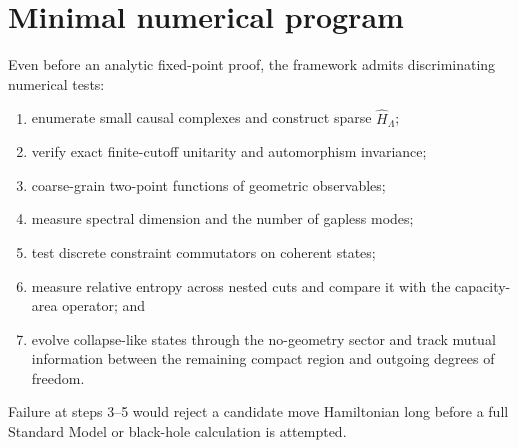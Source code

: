 \documentclass[11pt]{article}
\theoremstyle{remark}
\begin{document}
\section{Minimal numerical program}

Even before an analytic fixed-point proof, the framework admits
discriminating numerical tests:
\begin{enumerate}
  \item enumerate small causal complexes and construct sparse
        \(\widehat H_\Lambda\);
  \item verify exact finite-cutoff unitarity and automorphism invariance;
  \item coarse-grain two-point functions of geometric observables;
  \item measure spectral dimension and the number of gapless modes;
  \item test discrete constraint commutators on coherent states;
  \item measure relative entropy across nested cuts and compare it with
        the capacity-area operator; and
  \item evolve collapse-like states through the no-geometry sector and
        track mutual information between the remaining compact region
        and outgoing degrees of freedom.
\end{enumerate}
Failure at steps 3--5 would reject a candidate move Hamiltonian long
before a full Standard Model or black-hole calculation is attempted.
\end{document}
